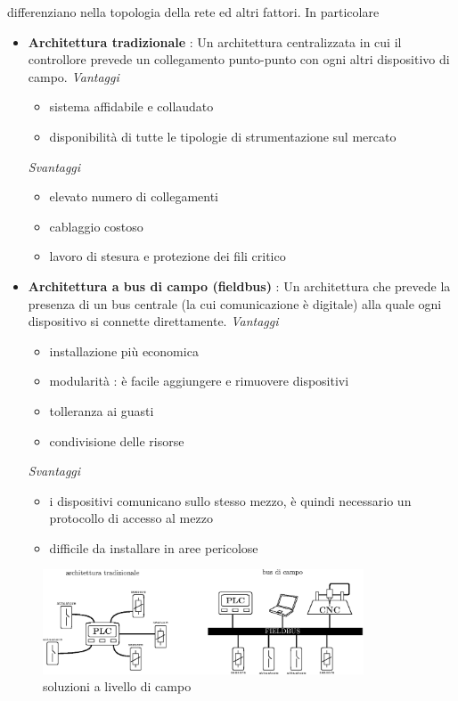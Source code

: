 \documentclass[10pt, letterpaper]{report}
\begin{document}
differenziano nella topologia della rete ed altri fattori. In particolare\begin{itemize}
    \item \textbf{Architettura tradizionale} : Un architettura centralizzata in cui il controllore 
    prevede un collegamento punto-punto con ogni altri dispositivo di campo.\acc 
    \textit{Vantaggi}\begin{itemize}
        \item sistema affidabile e collaudato 
        \item disponibilità di tutte le tipologie di
        strumentazione sul mercato
    \end{itemize}
    \textit{Svantaggi}\begin{itemize}
        \item elevato numero di collegamenti 
        \item cablaggio costoso 
        \item lavoro di stesura e protezione dei fili critico
    \end{itemize}
    \item \textbf{Architettura a bus di campo (fieldbus)} : Un architettura che prevede la presenza di 
    un bus centrale (la cui comunicazione è digitale)
     alla quale ogni dispositivo si connette direttamente.\acc
     \textit{Vantaggi}\begin{itemize}
        \item installazione più economica 
        \item modularità : è facile aggiungere e rimuovere dispositivi 
        \item tolleranza ai guasti 
        \item condivisione delle risorse
    \end{itemize}
    \textit{Svantaggi}\begin{itemize}
        \item i dispositivi comunicano sullo stesso mezzo, è quindi necessario un protocollo di 
        accesso al mezzo 
        \item difficile da installare in aree pericolose
    \end{itemize}
\end{itemize}\begin{figure}[h!]
    \centering
    \includegraphics[width=0.85\textwidth ]{images/tradVSfieldbus.eps}
    \caption{soluzioni a livello di campo}
\end{figure}
\end{document}
